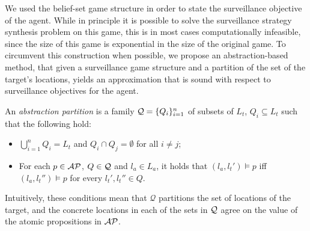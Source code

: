 We used the belief-set game structure in order to state the surveillance objective of the agent. While in principle it is possible to solve the surveillance strategy synthesis problem on this game, this is in most cases computationally infeasible, since the size of this game is exponential in the size of the original game. To circumvent this construction when possible, we propose an abstraction-based method, that given a surveillance game structure and a partition of the set of the target's locations, yields an approximation that is sound with respect to surveillance objectives for the agent.


An \emph{abstraction partition} is a family $\mathcal{Q} = \{Q_i\}_{i=1}^n$ of subsets of $L_t$, $Q_i \subseteq L_t$ such that the following hold:
\begin{itemize}
\item $\bigcup_{i=1}^n Q_i = L_t$ and $Q_i \cap Q_j = \emptyset$ for all $i \neq j$;
\item For each $p \in \mathcal{AP}$, $Q \in \mathcal{Q}$ and $l_a \in L_a$, it holds that $(l_a,l_t') \models p$ iff $(l_a,l_t'') \models p$ for every $l_t',l_t'' \in Q$.
\end{itemize}
Intuitively, these conditions mean that $\mathcal Q$ partitions the set of locations of the target, and the concrete locations in each of the sets in $\mathcal{Q}$ agree on the value of the atomic propositions in $\mathcal{AP}$.

